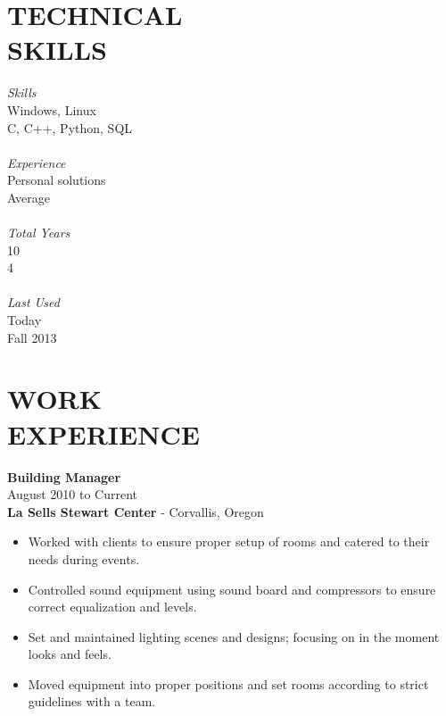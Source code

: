\documentclass[mm]{res}
\begin{document}
\begin{resume}
\section{TECHNICAL \\ SKILLS} 
\begin{multicols}{4}
	{\sl Skills} \\
	Windows, Linux \\
	C, C++, Python, SQL \\ \\
	{\sl Experience} \\
	Personal solutions \\
	Average \\ \\
	{\sl Total Years} \\
	10 \\
	4 \\ \\ 
	{\sl Last Used} \\
	Today \\
	Fall 2013 \\
\end{multicols}
 
\section{WORK \\ EXPERIENCE}  
	\textbf{Building Manager} \\
	August 2010 to Current \\                
	\textbf{La Sells Stewart Center} - Corvallis, Oregon \\
\begin{itemize}
	\item Worked with clients to ensure proper setup of rooms and catered to their needs during events. \\
	\item Controlled sound equipment using sound board and compressors to ensure correct equalization and levels. \\
	\item Set and maintained lighting scenes and designs; focusing on in the moment looks  and feels. \\
	\item Moved equipment into proper positions and set rooms according to strict guidelines with a team. \\
\end{itemize}



\end{resume}
\end{document}
